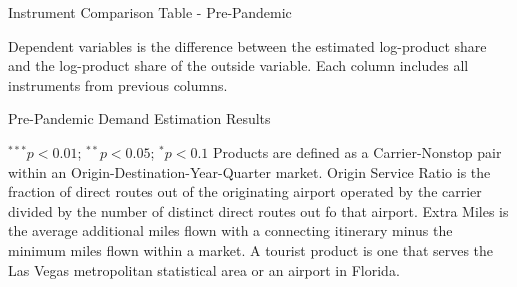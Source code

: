 \documentclass{article}
\begin{document}
\begin{appendices}
	\begin{landscape}
		\begin{table}
			\caption{Instrument Comparison Table - Pre-Pandemic}
			\label{tab:Instrument_Compare_Pre}
			
			\footnotesize{Dependent variables is the difference between the estimated log-product share and the log-product share of the outside variable. Each column includes all instruments from previous columns.}
		\end{table}
	\end{landscape}
	
	
	\begin{table}
		\caption{Pre-Pandemic Demand Estimation Results}
		\label{tab:Results_PrePandemic}
		
		\footnotesize{$^{***}p<0.01$; $^{**}p<0.05$; $^{*}p<0.1$ Products are defined as a Carrier-Nonstop pair within an Origin-Destination-Year-Quarter market. Origin Service Ratio is the fraction of direct routes out of the originating airport operated by the carrier divided by the number of distinct direct routes out fo that airport. Extra Miles is the average additional miles flown with a connecting itinerary minus the minimum miles flown within a market.  A tourist product is one that serves the Las Vegas metropolitan statistical area or an airport in Florida.}
	\end{table}
	

\end{appendices}
\end{document}
